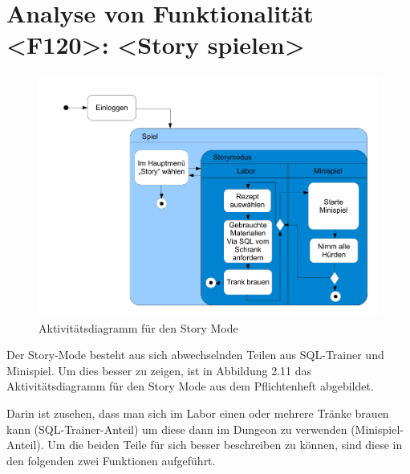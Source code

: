 \newpage
\section{Analyse von Funktionalität <F120>: <Story spielen>}
\begin{figure}[h]
\centering
\includegraphics[width=1.0\textwidth]{figures/Aktivitaetsdiagramm.pdf}
\caption{Aktivitätsdiagramm für den Story Mode}
\label{sequence}
\end{figure}
Der Story-Mode besteht aus sich abwechselnden Teilen aus SQL-Trainer und Minispiel. Um dies  besser zu zeigen, ist in Abbildung 2.11  das Aktivitätsdiagramm für den Story Mode aus dem Pflichtenheft abgebildet.

Darin ist zusehen, dass man sich im Labor einen oder mehrere Tränke brauen kann (SQL-Trainer-Anteil) um diese dann im Dungeon zu verwenden (Minispiel-Anteil).
Um die beiden Teile für sich besser beschreiben zu können, sind diese in den folgenden zwei Funktionen aufgeführt.

\newpage
